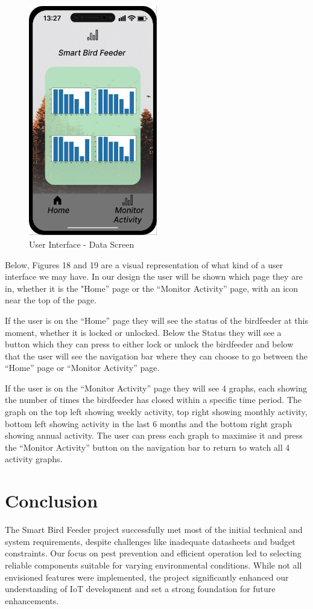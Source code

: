 \documentclass[12pt,a4paper]{article}
\begin{document}
\begin{figure}[h]
    \centering
    \includegraphics[width=0.5\textwidth]{images/UI_Data.png}
    \caption{User Interface - Data Screen}
\end{figure}

Below, Figures 18 and 19 are a visual representation of what kind of a user interface we may have. In our design the user will be shown which page they are in, whether it is the "Home” page or the “Monitor Activity” page, with an icon near the top of the page. 

If the user is on the “Home” page they will see the status of the birdfeeder at this moment, whether it is locked or unlocked. Below the Status they will see a button which they can press to either lock or unlock the birdfeeder and below that the user will see the navigation bar where they can choose to go between the “Home” page or “Monitor Activity” page. 

If the user is on the “Monitor Activity” page they will see 4 graphs, each showing the number of times the birdfeeder has closed within a specific time period. The graph on the top left showing weekly activity, top right showing monthly activity, bottom left showing activity in the last 6 months and the bottom right graph showing annual activity. The user can press each graph to maximise it and press the “Monitor Activity” button on the navigation bar to return to watch all 4 activity graphs. 
\section{Conclusion}
The Smart Bird Feeder project successfully met most of the initial technical and system requirements, despite challenges like inadequate datasheets and budget constraints. Our focus on pest prevention and efficient operation led to selecting reliable components suitable for varying environmental conditions. While not all envisioned features were implemented, the project significantly enhanced our understanding of IoT development and set a strong foundation for future enhancements.
\end{document}
